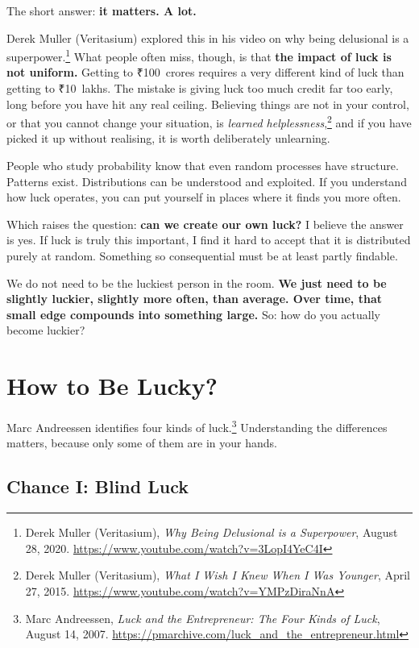 The short answer: \textbf{it matters. A lot.}

Derek Muller (Veritasium) explored this in his video on why being delusional is a superpower.\footnote{Derek Muller (Veritasium), \emph{Why Being Delusional is a Superpower}, August 28, 2020. \url{https://www.youtube.com/watch?v=3LopI4YeC4I}} What people often miss, though, is that \textbf{the impact of luck is not uniform.} Getting to \mbox{₹100 crores} requires a very different kind of luck than getting to \mbox{₹10 lakhs}. The mistake is giving luck too much credit far too early, long before you have hit any real ceiling. Believing things are not in your control, or that you cannot change your situation, is \emph{learned helplessness},\footnote{Derek Muller (Veritasium), \emph{What I Wish I Knew When I Was Younger}, April 27, 2015. \url{https://www.youtube.com/watch?v=YMPzDiraNnA}} and if you have picked it up without realising, it is worth deliberately unlearning.

People who study probability know that even random processes have structure. Patterns exist. Distributions can be understood and exploited. If you understand how luck operates, you can put yourself in places where it finds you more often.

Which raises the question: \textbf{can we create our own luck?} I believe the answer is yes. If luck is truly this important, I find it hard to accept that it is distributed purely at random. Something so consequential must be at least partly findable.

We do not need to be the luckiest person in the room. \textbf{We just need to be slightly luckier, slightly more often, than average. Over time, that small edge compounds into something large.} So: how do you actually become luckier?

\section{How to Be Lucky?}
\label{sec:ch01-how-to-be-lucky}

Marc Andreessen identifies four kinds of luck.\footnote{Marc Andreessen, \emph{Luck and the Entrepreneur: The Four Kinds of Luck}, August 14, 2007. \url{https://pmarchive.com/luck_and_the_entrepreneur.html}} Understanding the differences matters, because only some of them are in your hands.

\subsection{Chance I: Blind Luck}

